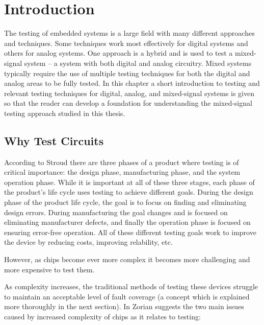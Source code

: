 \documentclass[12pt]{report}
\begin{document}
\normalem       %


\chapter{Introduction}  %

The testing of embedded systems is a large field with many different approaches and techniques.  Some techniques work most effectively for digital systems and others for analog systems.  One approach is a hybrid and is used to test a mixed-signal system -- a system with both digital and analog circuitry\cite{needed}.  Mixed systems typically require the use of multiple testing techniques for both the digital and analog areas to be fully tested.  In this chapter a short introduction to testing and relevant testing techniques for digital, analog, and mixed-signal systems is given so that the reader can develop a foundation for understanding the mixed-signal testing approach studied in this thesis. 

\section{Why Test Circuits}
\label{sct:whytest}
According to Stroud\cite{stroud} there are three phases of a product where testing is of critical importance: the design phase, manufacturing phase, and the system operation phase.  While it is important at all of these three stages, each phase of the product's life cycle uses testing to achieve different goals.  During the design phase of the product life cycle, the goal is to focus on finding and eliminating design errors.  During manufacturing the goal changes and is focused on eliminating manufacturer defects, and finally the operation phase is focused on ensuring error-free operation.  All of these different testing goals work to improve the device by reducing costs, improving relability, etc.  

However, as chips become ever more complex it becomes more challenging and more expensive to test them\cite{itrs}.

As complexity increases, the traditional methods of testing these devices struggle to maintain an acceptable level of fault coverage (a concept which is explained more thoroughly in the next section).  In \cite{zorian} Zorian suggests the two main issues caused by increased complexity of chips as it relates to testing:
\end{document}
